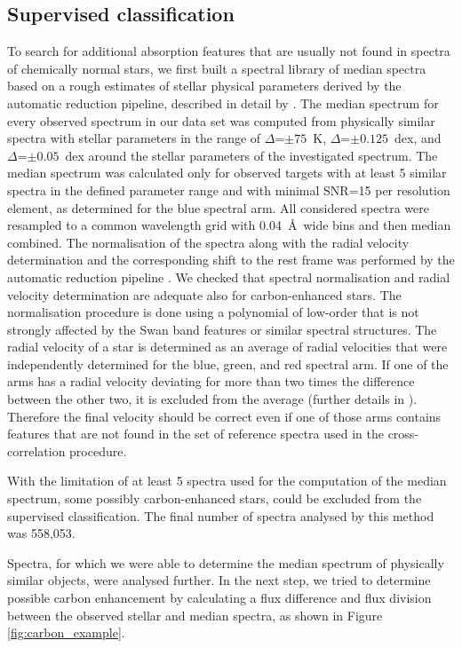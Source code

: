 \subsection{Supervised classification}
\label{sec:supervised}
To search for additional absorption features that are usually not found in spectra of chemically normal stars, we first built a spectral library of median spectra based on a rough estimates of stellar physical parameters derived by the automatic reduction pipeline, described in detail by \citet{2017MNRAS.464.1259K}. The median spectrum for every observed spectrum in our data set was computed from physically similar spectra with stellar parameters in the range of $\Delta$\Teff=$\pm75$~K, $\Delta$\Logg=$\pm0.125$~dex, and $\Delta$\Feh=$\pm0.05$~dex around the stellar parameters of the investigated spectrum. The median spectrum was calculated only for observed targets with at least 5 similar spectra in the defined parameter range and with minimal SNR=15 per resolution element, as determined for the blue spectral arm. All considered spectra were resampled to a common wavelength grid with 0.04~\AA\ wide bins and then median combined. The normalisation of the spectra along with the radial velocity determination and the corresponding shift to the rest frame was performed by the automatic reduction pipeline \citep{2017MNRAS.464.1259K}. We checked that spectral normalisation and radial velocity determination are adequate also for carbon-enhanced stars. The normalisation procedure is done using a polynomial of low-order that is not strongly affected by the Swan band features or similar spectral structures. The radial velocity of a star is determined as an average of radial velocities that were independently determined for the blue, green, and red spectral arm. If one of the arms has a radial velocity deviating for more than two times the difference between the other two, it is excluded from the average (further details in \citet{2017MNRAS.464.1259K}). Therefore the final velocity should be correct even if one of those arms contains features that are not found in the set of reference spectra used in the cross-correlation procedure.

With the limitation of at least 5 spectra used for the computation of the median spectrum, some possibly carbon-enhanced stars, could be excluded from the supervised classification. The final number of spectra analysed by this method was 558,053.

Spectra, for which we were able to determine the median spectrum of physically similar objects, were analysed further. In the next step, we tried to determine possible carbon enhancement by calculating a flux difference and flux division between the observed stellar and median spectra, as shown in Figure \ref{fig:carbon_example}.

